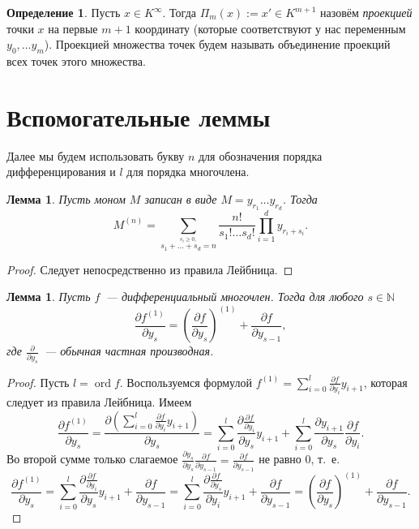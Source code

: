 \documentclass[16pt]{article}
\DeclareMathOperator{\ord}{ord}
\renewcommand{\ge}{\geqslant} %
\theoremstyle{plain1}
\newtheorem{lemma}[theorem1]{Лемма}
\theoremstyle{plain2}
\theoremstyle{plain}
\theoremstyle{plain3}
\theoremstyle{definition}
\newtheorem{definition}[theorem2]{Определение}
\theoremstyle{remark}
\begin{document}
\begin{definition}
Пусть $x\in K^{\infty}$. Тогда $\Pi_m(x):=x'\in K^{m+1}$ назовём \emph{проекцией}
точки $x$ на первые $m+1$ координату (которые соответствуют у нас
переменным $y_0,\ldots y_m$). Проекцией множества точек будем называть объединение проекций всех точек этого множества.
\end{definition}


\section{Вспомогательные леммы}

Далее мы будем использовать букву $n$ для обозначения порядка дифференцирования и $l$ для порядка многочлена.


\begin{lemma}\label{lemma:der_monom}
Пусть моном $M$ записан в виде $M=y_{r_1}\ldots y_{r_d}$. Тогда
$$
M^{(n)} =\sum\limits_{\stackrel{s_i\ge0,}{
s_1+\ldots+s_d=n}}\frac{n!}{s_1!\ldots s_d!}
\prod\limits_{i=1}^dy_{r_i+s_i}.
$$
\end{lemma}
\begin{proof}
Следует непосредственно из правила Лейбница.
\end{proof}


\begin{lemma}\label{lemma:commutative derivatives}
Пусть $f$~--- дифференциальный многочлен. Тогда для любого $s\in\mathbb{N}$ 
$$
\frac{\partial f^{(1)}}{\partial y_s}=\left(\frac{\partial f}{\partial y_s}\right)^{(1)}+\frac{\partial f}{\partial y_{s-1}},
$$
где $\frac{\partial}{\partial y_s}$~--- обычная частная производная.
\end{lemma}
\begin{proof}
Пусть $l=\ord f$. Воспользуемся формулой $f^{(1)}=\sum\limits_{i=0}^l\frac{\partial f}{\partial y_i}y_{i+1}$, которая следует из правила Лейбница. Имеем 
$$
\frac{\partial f^{(1)}}{\partial y_s}=\frac{\partial\left(\sum\limits_{i=0}^l\frac{\partial f}{\partial y_i}y_{i+1}\right)}{\partial y_s}=\sum\limits_{i=0}^l\frac{\partial \frac{\partial f}{\partial y_i} }{\partial y_s}y_{i+1}+\sum\limits_{i=0}^l\frac{\partial y_{i+1}}{\partial y_s}\frac{\partial f}{\partial y_i}.
$$
Во второй сумме только слагаемое 
$\frac{\partial y_{s}}{\partial y_s}\frac{\partial f}{\partial y_{s-1}}=\frac{\partial f}{\partial y_{s-1}}$ 
не равно 0, т.~е. 
$$
\frac{\partial f^{(1)}}{\partial y_s}=\sum\limits_{i=0}^l\frac{\partial \frac{\partial f}{\partial y_i}}{\partial y_s}y_{i+1}+\frac{\partial f}{\partial y_{s-1}}=\sum\limits_{i=0}^l\frac{\partial \frac{\partial f}{\partial y_s}}{\partial y_i}y_{i+1}+\frac{\partial f}{\partial y_{s-1}}=\left(\frac{\partial f}{\partial y_s}\right)^{(1)}+\frac{\partial f}{\partial y_{s-1}}.
$$
\end{proof}
\end{document}
